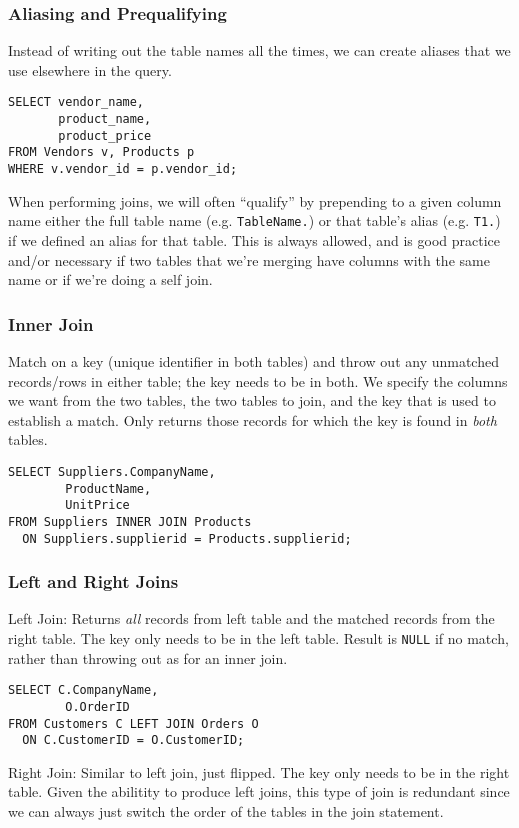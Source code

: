 \documentclass[12pt]{article}
\theoremstyle{plain}
\theoremstyle{definition}
\theoremstyle{remark}
\begin{document}
\subsubsection{Aliasing and Prequalifying}

Instead of writing out the table names all the times, we can create
aliases that we use elsewhere in the query.
\begin{lstlisting}
SELECT vendor_name,
       product_name,
       product_price
FROM Vendors v, Products p
WHERE v.vendor_id = p.vendor_id;
\end{lstlisting}
When performing joins, we will often ``qualify'' by
prepending to a given column name either the full table name (e.g.
\texttt{TableName.}) or that table's alias (e.g. \texttt{T1.}) if we
defined an alias for that table.
This is always allowed, and is good practice and/or necessary if two
tables that we're merging have columns with the same name or if
we're doing a self join.


\subsubsection{Inner Join}

Match on a key (unique identifier in both tables) and throw out any
unmatched records/rows in either table; the key needs to be in both.
We specify the columns we want from the two tables, the two tables
to join, and the key that is used to establish a match.
Only returns those records for which the key is found in \emph{both}
tables.
\begin{lstlisting}
SELECT Suppliers.CompanyName,
        ProductName,
        UnitPrice
FROM Suppliers INNER JOIN Products
  ON Suppliers.supplierid = Products.supplierid;
\end{lstlisting}


\subsubsection{Left and Right Joins}

Left Join:
Returns \emph{all} records from left table and the matched records
from the right table.
The key only needs to be in the left table.
Result is \texttt{NULL} if no match, rather
than throwing out as for an inner join.
\begin{lstlisting}
SELECT C.CompanyName,
        O.OrderID
FROM Customers C LEFT JOIN Orders O
  ON C.CustomerID = O.CustomerID;
\end{lstlisting}
Right Join: Similar to left join, just flipped.
The key only needs to be in the right table.
Given the abilitity to produce left joins, this type of join is
redundant since we can always just switch the order of the tables in the
join statement.
\end{document}
